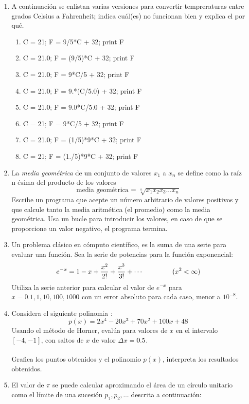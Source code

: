 \documentclass[12pt]{article}
\begin{document}
\begin{enumerate}
\item A continuaci\'{o}n se enlistan varias versiones para convertir tempreraturas entre grados Celsius a Fahrenheit; indica cuál(es) no funcionan bien y explica el por qué.
\begin{enumerate}
\item C = 21; F = 9/5*C + 32; print F
\item C = 21.0; F = (9/5)*C + 32; print F
\item C = 21.0; F = 9*C/5 + 32; print F
\item C = 21.0; F = 9.*(C/5.0) + 32; print F
\item C = 21.0; F = 9.0*C/5.0 + 32; print F
\item C = 21; F = 9*C/5 + 32; print F
\item C = 21.0; F = (1/5)*9*C + 32; print F
\item C = 21; F = (1./5)*9*C + 32; print F
\end{enumerate}
\item La \textit{media geom\'{e}trica} de un conjunto de valores $x_{1}$ a $x_{n}$ se define como la ra\'{i}z n-\'{e}sima del producto de los valores
\[ \text{media geom\'{e}trica = } \sqrt[n]{x_{1}x_{2}x_{3} \ldots x_{n}}\]
Escribe un programa que acepte un n\'{u}mero arbitrario de valores positivos y que calcule tanto la media aritm\'{e}tica (el promedio) como la media geom\'{e}trica. Usa un bucle para introducir los valores, en caso de que se proporcione un valor negativo, el programa termina.
\item Un problema cl\'{a}sico en c\'{o}mputo cient\'{i}fico, es la suma de una serie para evaluar una funci\'{o}n. Sea la serie de potencias para la funci\'{o}n exponencial:
\[e^{-x} = 1 - x + \dfrac{x^{2}}{2!} + \dfrac{x^{3}}{3!} +\cdots \hspace{1.5cm} (x^{2} < \infty)  \]
Utiliza la serie anterior para calcular el valor de $e^{-x}$ para $x=0.1,1,10, 100, 1000$ con un error absoluto para cada caso, menor a $10^{-8}$.
\item Considera el siguiente polinomia :
\[p(x)= 2x^{4} - 20x^{3} + 70x^{2}+ 100x+48 \]
Usando el m\'{e}todo de Horner, eval\'{u}a para valores de $x$ en el intervalo $[-4,-1]$, con saltos de $x$ de valor $\Delta x = 0.5$.
\\
\\
Grafica los puntos obtenidos y el polinomio $p(x)$, interpreta los resultados obtenidos.
\item El valor de $\pi$ se puede calcular aproximando el \'{a}rea de un c\'{i}rculo unitario como el l\'{i}mite de una sucesi\'{o}n $p_{1}, p_{2}, \ldots$ descrita a continuaci\'{o}n:

\end{enumerate}
\end{document}
